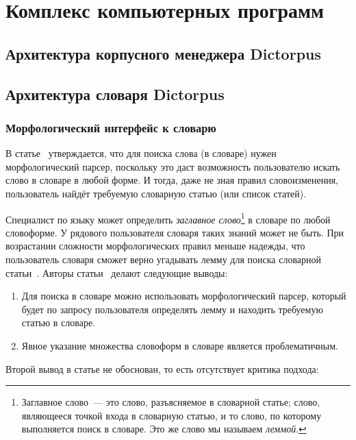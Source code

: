 \chapter{Комплекс компьютерных программ} \label{chapt_comp}

\section{Архитектура корпусного менеджера Dictorpus} \label{sect_arch_soft}


\section{Архитектура словаря Dictorpus} \label{sect_dictionary}

\subsection{Морфологический интерфейс к словарю} \label{sect_morpho_API_to_dict}

В статье~\cite[с.~65]{morphoAPI2dict2004Maxwell} утверждается, 
что для поиска слова (в словаре) нужен морфологический парсер, 
поскольку это даст возможность пользователю искать слово в словаре в любой форме. 
И тогда, даже не зная правил словоизменения, пользователь найдёт требуемую словарную статью (или список статей).

Специалист по языку может определить \emph{заглавное слово}\footnote{Заглавное слово~--- это слово, разъясняемое в словарной статье; слово, являющееся точкой входа в словарную статью, и то слово, по которому выполняется поиск в словаре. Это же слово мы называем \emph{леммой}.} в словаре по любой словоформе. У рядового пользователя словаря таких знаний может не быть.
При возрастании сложности морфологических правил меньше надежды, 
что пользователь словаря сможет верно угадывать лемму 
для поиска словарной статьи~\cite[с.~66]{morphoAPI2dict2004Maxwell}. 
Авторы статьи~\cite{morphoAPI2dict2004Maxwell} делают следующие выводы:
\begin{enumerate}
\item Для поиска в словаре можно использовать морфологический парсер, который будет по запросу пользователя определять лемму и находить требуемую статью в словаре.
\item Явное указание множества словоформ в словаре является проблематичным.
\end{enumerate}

\noindent
Второй вывод в статье не обоснован,
то есть отсутствует критика подхода: 

